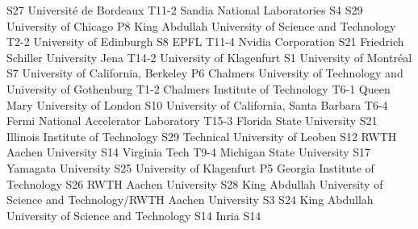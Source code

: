 \begin{multicols}{2}
{S27}
{}
{}
{}
{}
{}
{}
{Université de Bordeaux}
{T11-2}
{}
{}
{}
{}
{}
{}
{Sandia National Laboratories}
{S4}
{S29}
{}
{}
{}
{}
{}
{University of Chicago}
{P8}
{}
{}
{}
{}
{}
{}
{King Abdullah University of Science and Technology}
{T2-2}
{}
{}
{}
{}
{}
{}
{University of Edinburgh}
{S8}
{}
{}
{}
{}
{}
{}
{EPFL}
{T11-4}
{}
{}
{}
{}
{}
{}
{Nvidia Corporation}
{S21}
{}
{}
{}
{}
{}
{}
{Friedrich Schiller University Jena}
{T14-2}
{}
{}
{}
{}
{}
{}
{University of Klagenfurt}
{S1}
{}
{}
{}
{}
{}
{}
{University of Montréal}
{S7}
{}
{}
{}
{}
{}
{}
{University of California, Berkeley}
{P6}
{}
{}
{}
{}
{}
{}
{Chalmers University of Technology and University of Gothenburg}
{T1-2}
{}
{}
{}
{}
{}
{}
{Chalmers Institute of Technology}
{T6-1}
{}
{}
{}
{}
{}
{}
{Queen Mary University of London}
{S10}
{}
{}
{}
{}
{}
{}
{University of California, Santa Barbara}
{T6-4}
{}
{}
{}
{}
{}
{}
{Fermi National Accelerator Laboratory}
{T15-3}
{}
{}
{}
{}
{}
{}
{Florida State University}
{S21}
{}
{}
{}
{}
{}
{}
{Illinois Institute of Technology}
{S29}
{}
{}
{}
{}
{}
{}
{Technical University of Leoben}
{S12}
{}
{}
{}
{}
{}
{}
{RWTH Aachen University}
{S14}
{}
{}
{}
{}
{}
{}
{Virginia Tech}
{T9-4}
{}
{}
{}
{}
{}
{}
{Michigan State University}
{S17}
{}
{}
{}
{}
{}
{}
{Yamagata University}
{S25}
{}
{}
{}
{}
{}
{}
{University of Klagenfurt}
{P5}
{}
{}
{}
{}
{}
{}
{Georgia Institute of Technology}
{S26}
{}
{}
{}
{}
{}
{}
{RWTH Aachen University}
{S28}
{}
{}
{}
{}
{}
{}
{King Abdullah University of Science and Technology/RWTH Aachen University}
{S3}
{S24}
{}
{}
{}
{}
{}
{King Abdullah University of Science and Technology}
{S14}
{}
{}
{}
{}
{}
{}
{Inria}
{S14}
{}
{}
{}
{}
{}
{}

\end{multicols}
